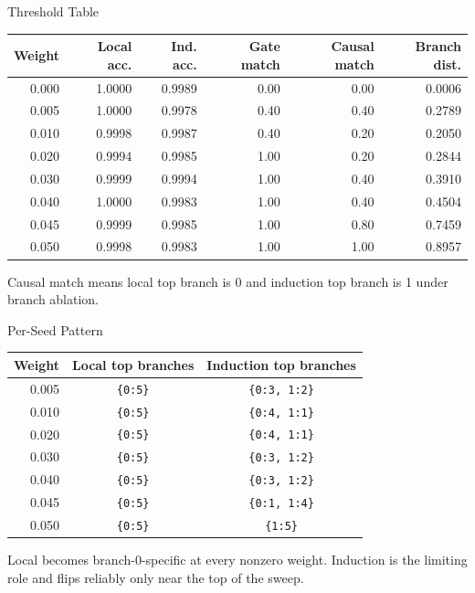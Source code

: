 \documentclass[aspectratio=169]{beamer}
\begin{document}
\begin{frame}{Threshold Table}
  \begin{center}
  \scriptsize
  \begin{tabular}{rrrrrr}
    \toprule
    Weight & Local acc. & Ind. acc. & Gate match & Causal match & Branch dist. \\
    \midrule
    0.000 & 1.0000 & 0.9989 & 0.00 & 0.00 & 0.0006 \\
    0.005 & 1.0000 & 0.9978 & 0.40 & 0.40 & 0.2789 \\
    0.010 & 0.9998 & 0.9987 & 0.40 & 0.20 & 0.2050 \\
    0.020 & 0.9994 & 0.9985 & 1.00 & 0.20 & 0.2844 \\
    0.030 & 0.9999 & 0.9994 & 1.00 & 0.40 & 0.3910 \\
    0.040 & 1.0000 & 0.9983 & 1.00 & 0.40 & 0.4504 \\
    0.045 & 0.9999 & 0.9985 & 1.00 & 0.80 & 0.7459 \\
    0.050 & 0.9998 & 0.9983 & 1.00 & 1.00 & 0.8957 \\
    \bottomrule
  \end{tabular}
  \end{center}

  \vspace{0.5em}
  Causal match means local top branch is 0 and induction top branch is 1 under
  branch ablation.
\end{frame}

\begin{frame}{Per-Seed Pattern}
  \begin{center}
  \scriptsize
  \begin{tabular}{rcc}
    \toprule
    Weight & Local top branches & Induction top branches \\
    \midrule
    0.005 & \texttt{\{0:5\}} & \texttt{\{0:3, 1:2\}} \\
    0.010 & \texttt{\{0:5\}} & \texttt{\{0:4, 1:1\}} \\
    0.020 & \texttt{\{0:5\}} & \texttt{\{0:4, 1:1\}} \\
    0.030 & \texttt{\{0:5\}} & \texttt{\{0:3, 1:2\}} \\
    0.040 & \texttt{\{0:5\}} & \texttt{\{0:3, 1:2\}} \\
    0.045 & \texttt{\{0:5\}} & \texttt{\{0:1, 1:4\}} \\
    0.050 & \texttt{\{0:5\}} & \texttt{\{1:5\}} \\
    \bottomrule
  \end{tabular}
  \end{center}

  \vspace{0.7em}
  Local becomes branch-0-specific at every nonzero weight. Induction is the
  limiting role and flips reliably only near the top of the sweep.
\end{frame}
\end{document}
